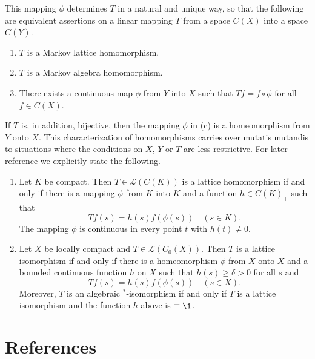 This mapping $\phi$ determines $T$ in a natural and unique way, so that the following are equivalent assertions on a linear mapping $T$ from a space $C(X)$ into a space $C(Y)$.
\begin{enumerate}[\upshape (a)]
\item 
	$T$ is a Markov lattice homomorphism.
\item 
	$T$ is a Markov algebra homomorphism.
\item 
	There exists a continuous map $\phi$ from $Y$ into $X$ such that $Tf = f \circ \phi$ for all $f \in 	C(X)$.
\end{enumerate}
If\/ $T$ is, in addition, bijective, then the mapping $\phi$ in (c) is a homeomorphism from $Y$ onto $X$.
This characterization of homomorphisms carries over mutatis mutandis to situations where the conditions on $X$, $Y$ or $T$ are less restrictive.
For later reference we explicitly state the following.
\begin{enumerate}[\upshape (i), labelindent=.25em]
\item 
	Let $K$ be compact. Then $ T \in \mathcal{L}(C(K)) $ is a lattice homomorphism if and only if there is a mapping 
$\phi$ from $K$ into $K$ and a function $h \in C(K)_{+}$ such that 
%
\[
	Tf(s) = h(s)f(\phi(s)) \quad (s \in K) .
\]
%
The mapping $\phi$ is continuous in every point $t$ with $h(t) \neq 0$.

\item 
Let $X$ be locally compact and $T \in \mathcal{L}(C_{0}(X))$.
Then $T$ is a lattice isomorphism if and only if there is a homeomorphism $\phi$ from $X$ onto $X$ and a bounded continuous function $h$ on $X$ such that $h(s) \geq \delta > 0$ for all $s$ and 
%
\[
	Tf(s) = h(s)f(\phi(s)) \quad (s \in X) .
\]
%
Moreover, $T$ is an algebraic $^{*}$-isomorphism if and only if\/ $T$ is a lattice isomorphism and the function $h$ above is $\equiv \1$.
\end{enumerate}
\section*{References}
{\RaggedRight
\nocite{semadeni:1971}
  \printbibliography[heading=none]
 }
